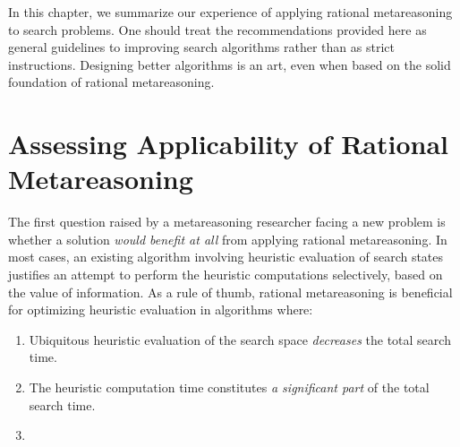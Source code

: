 In this chapter, we summarize our experience of applying rational
metareasoning to search problems. One should treat the recommendations
provided here as general guidelines to improving search algorithms
rather than as strict instructions. Designing better algorithms is an
art, even when based on the solid foundation of rational
metareasoning.

\section{Assessing Applicability of Rational Metareasoning}

The first question raised by a metareasoning researcher facing a new
problem is whether a solution \emph{would benefit at all} from
applying rational metareasoning. In most cases, an existing algorithm
involving heuristic evaluation of search states justifies an attempt
to perform the heuristic computations selectively, based on the value
of information. As a rule of thumb, rational metareasoning is beneficial for
optimizing heuristic evaluation in algorithms where:
\begin{enumerate}
\item Ubiquitous heuristic evaluation of the search space \emph{decreases} the total search
  time.
\item The heuristic computation time constitutes \emph{a significant part} of
  the total search time. 
\item {}
\end{enumerate}


